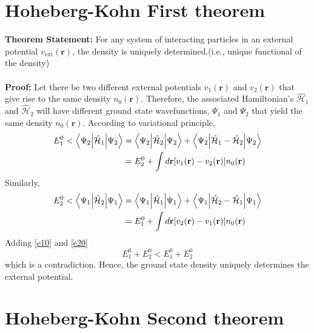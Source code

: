 \section{Hoheberg-Kohn First theorem}\label{appendix_dft}

\textbf{Theorem Statement:} For any system of interacting particles in an external potential $v_{\text{ext}}(\mathbf{r})$, the density is uniquely determined.(i.e., unique functional of the density)\\ \\ 
\textbf{Proof:} Let there be two different external potentials $v_1(\mathbf{r})$ and $v_2(\mathbf{r})$ that give rise to the same density $n_0(\mathbf{r})$. Therefore, the associated Hamiltonian's $\hat{\mathcal{H}}_1$ and $\hat{\mathcal{H}}_2$ will have different ground state wavefunctions, $\Psi_1$ and $\Psi_2$ that yield the same density $n_0(\mathbf{r})$. According to variational principle, 
\begin{align}
    E_1^0 < \ev**{\hat{\mathcal{H}}_1}{\Psi_2} &= \ev**{\hat{\mathcal{H}}_2}{\Psi_2} + \ev**{\hat{\mathcal{H}}_1 - \hat{\mathcal{H}}_2}{\Psi_2}  \\
    &= E_2^0 + \int d\mathbf{r}[v_1(\mathbf{r})-v_2(\mathbf{r})]n_0(\mathbf{r}) \label{e10}
\end{align}
Similarly,
\begin{align}
    E_2^0 < \ev**{\hat{\mathcal{H}}_2}{\Psi_1} &= \ev**{\hat{\mathcal{H}}_1}{\Psi_1} + \ev**{\hat{\mathcal{H}}_2 - \hat{\mathcal{H}}_1}{\Psi_1}  \\
    &= E_1^0 + \int d\mathbf{r}[v_2(\mathbf{r})-v_1(\mathbf{r})]n_0(\mathbf{r}) \label{e20}
\end{align}
Adding \eqref{e10} and \eqref{e20}
\begin{equation}
    E_1^0 + E_2^0 < E_1^0 + E_2^0 
\end{equation}
which is a contradiction. Hence, the ground state density uniquely determines the external potential. 

\section{Hoheberg-Kohn Second theorem}

